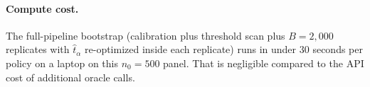 \paragraph{Compute cost.}
The full-pipeline bootstrap (calibration plus threshold scan plus
$B = 2{,}000$ replicates with $\hat t_\alpha$ re-optimized inside
each replicate) runs in under $30$ seconds per policy on a laptop on
this $n_0 = 500$ panel. That is negligible compared to the API cost
of additional oracle calls.
